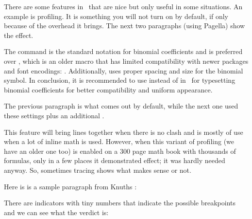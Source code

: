 \stopsectionlevel

\startsectionlevel[title=Profiling]

There are some features in \CONTEXT\ that are nice but only useful in some situations. An
example is profiling. It is something you will not turn on by default, if only because of
the overhead it brings. The next two paragraphs (using Pagella) show the effect.

\startbuffer
The command  is the standard notation for binomial coefficients and is
preferred over , which is an older macro that has limited
compatibility with newer packages and font encodings: .
Additionally,  uses proper spacing and size for the binomial symbol.
In conclusion, it is recommended to use  instead of  in
\TEX\ for typesetting binomial coefficients for better compatibility and uniform
appearance.\par
\stopbuffer

\bgroup \hsize 130mm
\switchtobodyfont[pagella,11pt]
\showmakeup[line]
\getbuffer
\egroup

The previous paragraph is what comes out by default, while the next one used
these settings plus an additional .

\startbuffer[demo]
\setuplineprofile[factor=0.1,step=0.5\emwidth]
\setupalign[profile]
\stopbuffer

\bgroup \hsize 130mm
\switchtobodyfont[pagella,11pt]
\showmakeup[line]
\getbuffer[demo]
\getbuffer
{}
\egroup

This feature will bring lines together when there is no clash and is mostly of
use when a lot of inline math is used. However, when this variant of profiling
(we have an older one too) is enabled on a 300 page math book with thousands of
formulas, only in a few places it demonstrated effect; it was hardly needed
anyway. So, sometimes tracing shows what makes sense or not.

\stopsectionlevel

\startsectionlevel[title=Par builder]

Here is is a sample paragraph from Knuths :

\startshowbreakpoints%
\stopshowbreakpoints

There are indicators with tiny numbers that indicate the possible breakpoints and
we can see what the verdict is:

